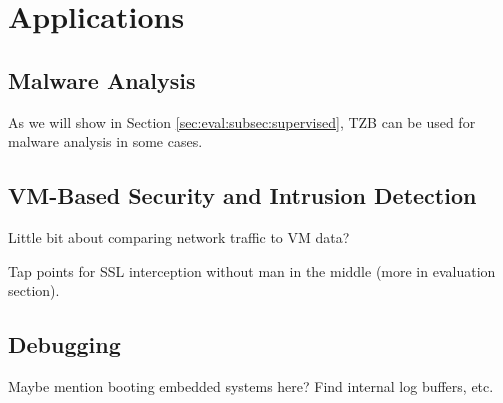 \section{Applications}

\subsection{Malware Analysis}

As we will show in Section \ref{sec:eval:subsec:supervised}, TZB can be used for malware analysis in some cases.

\subsection{VM-Based Security and Intrusion Detection}

Little bit about comparing network traffic to VM data?

Tap points for SSL interception without man in the middle (more in evaluation section).

\subsection{Debugging}

Maybe mention booting embedded systems here? Find internal log buffers, etc.
